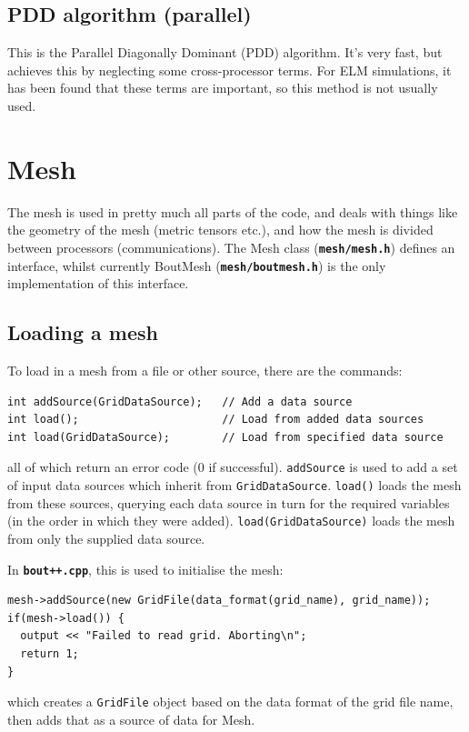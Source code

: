 \documentclass[12pt]{article}
\newcommand{\code}[1]{\texttt{#1}}
\newcommand{\file}[1]{\texttt{\bf #1}}
\begin{document}
\subsection{PDD algorithm (parallel)}

This is the Parallel Diagonally Dominant (PDD) algorithm. It's very fast, but
achieves this by neglecting some cross-processor terms. For ELM simulations, it has
been found that these terms are important, so this method is not usually used. 

\section{Mesh}

The mesh is used in pretty much all parts of the code, and deals with 
things like the geometry of the mesh (metric tensors etc.), and how the
mesh is divided between processors (communications). The Mesh class
(\file{mesh/mesh.h}) defines an interface, whilst currently BoutMesh
(\file{mesh/boutmesh.h}) is the only implementation of this interface.

\subsection{Loading a mesh}

To load in a mesh from a file or other source, there are the commands:
\begin{lstlisting}
int addSource(GridDataSource);   // Add a data source
int load();                      // Load from added data sources
int load(GridDataSource);        // Load from specified data source
\end{lstlisting}
all of which return an error code (0 if successful). 
\code{addSource} is used to add a set of input data sources which
inherit from \code{GridDataSource}. \code{load()} loads the mesh
from these sources, querying each data source in turn for the required
variables (in the order in which they were added). \code{load(GridDataSource)}
loads the mesh from only the supplied data source.

In \file{bout++.cpp}, this is used to initialise the mesh:
\begin{lstlisting}
mesh->addSource(new GridFile(data_format(grid_name), grid_name));
if(mesh->load()) {
  output << "Failed to read grid. Aborting\n";
  return 1;
}
\end{lstlisting}
which creates a \code{GridFile} object based on the data format of 
the grid file name, then adds that as a source of data for Mesh.
\end{document}
